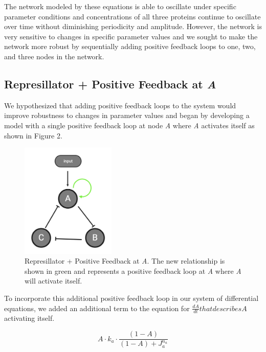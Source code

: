 \documentclass{article}
\begin{document}
The network modeled by these equations is able to oscillate under specific parameter conditions and concentrations of all three proteins continue to oscillate over time without diminishing periodicity and amplitude. However, the network is very sensitive to changes in specific parameter values and we sought to make the network more robust by sequentially adding positive feedback loops to one, two, and three nodes in the network. 

\subsection{Represillator + Positive Feedback at \textit{A}}

We hypothesized that adding positive feedback loops to the system would improve robustness to changes in parameter values and began by developing a model with a single positive feedback loop at node \textit{A} where \textit{A} activates itself as shown in Figure 2.

\begin{figure}[H]
    \centering
    \includegraphics[width=0.4\textwidth]{figure2.png}
    \caption{Represillator + Positive Feedback at \textit{A}. The new relationship is shown in green and represents a positive feedback loop at \textit{A} where \textit{A} will activate itself.}
    \label{fig:2}
\end{figure}

To incorporate this additional positive feedback loop in our system of differential equations, we added an additional term to the equation for \( \frac{dA}{dt} that describes \textit{A} \)activating itself. 

\[
A \cdot k_a \cdot \frac{(1 - A)}{(1 - A) + J_a^{n_a}}
\]
\end{document}
